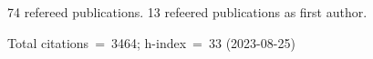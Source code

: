74 refereed publications. 13 refeered publications as first author.

Total citations~=~3464; h-index~=~33 (2023-08-25)